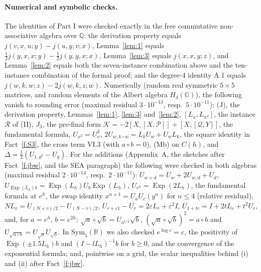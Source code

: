 \documentclass[11pt]{article}
\theoremstyle{remark}
\newcommand{\jp}{\circ}
\newcommand{\cP}{\mathcal P}\newcommand{\cQ}{\mathcal Q}\newcommand{\cL}{\mathcal L}
\newcommand{\cR}{\mathcal R}\newcommand{\cK}{\mathcal K}
\DeclareMathOperator{\Exp}{Exp}
\begin{document}
\paragraph{Numerical and symbolic checks.}
The identities of Part I were checked exactly in the free commutative non-associative
algebra over $\mathbb Q$: the derivation property equals $j(v,x,u;y) - j(u,y,v;x)$, Lemma~\ref{lem:1}
equals $\tfrac12j(y,x,x;y)-\tfrac12j(y,y,x;x)$, Lemma~\ref{lem:3} equals $j(x,x,y;z)$, and
Lemma~\ref{lem:2} equals both the seven-instance combination above and the ten-instance combination
of the formal proof; and the degree-4 identity A.1 equals $j(w,k,w;z) - 2j(w,k,z;w)$.
Numerically (random real symmetric $5\times5$ matrices, and random
elements of the Albert algebra $H_3(\mathbb O)$), the following vanish to rounding error
(maximal residual $3\cdot10^{-13}$, resp.\ $5\cdot10^{-11}$): (J), the derivation property, Lemmas~\ref{lem:1}, \ref{lem:3} and~\ref{lem:2},
$[L_x,L_{x^2}]$, the instance $\cR$ of (II), $J_3$, the pre-final form
$\cK = -2[X,[X,\cP]] + [X,[\cQ,Y]]$, the fundamental formula, $U_{x^2} = U_x^2$,
$2U_{w,k\jp w} = L_kU_w + U_wL_k$, the square identity in Fact~\ref{f:S3}, the cross term
VI.3 (with $a\jp b = 0$), (Mb) on $C(h)$, and $\Delta = \tfrac12(U_{1,g^2}-U_g)$.
For the additions (Appendix~A, the sketches after Fact~\ref{f:jbw}, and the SEA
paragraph) the following were checked in both algebras (maximal residual $2\cdot10^{-14}$,
resp.\ $2\cdot10^{-11}$): $U_{w+d} = U_w+2U_{w,d}+U_d$, $U_{\Exp(L_h)b} =
\Exp(L_h)U_b\Exp(L_h)$, $U_{e^h} = \Exp(2L_h)$, the fundamental formula at $e^h$, the swap
identity $x^{n+1} = U_aU_c(y^n)$ for $n\le4$ (relative residual), $NL_v =
U_{(N+v)/2}-U_{(N-v)/2}$, $U_{r+\varepsilon1}-U_r = 2\varepsilon L_r+\varepsilon^2I$,
$U_{1+tc} = I+2tL_c+t^2U_c$, and, for $a = e^h$, $b = e^{2h}$: $\sqrt a\jp\sqrt b =
U_{a^{1/4}}\sqrt b$, $(\sqrt a\jp\sqrt b)^2 = a\jp b$ and $U_{\sqrt{a\jp b}} =
U_{\sqrt a}U_{\sqrt b}$. In $\mathrm{Sym}_5(\mathbb R)$ we also checked $e^{\log c} = c$, the
positivity of $\Exp(\pm1.5L_h)b$ and $(I-lL_h)^{-1}b$ for $b\ge0$, and the convergence of
the exponential formula; and, pointwise on a grid, the scalar inequalities behind (i) and
(ii) after Fact~\ref{f:jbw}.
\end{document}
